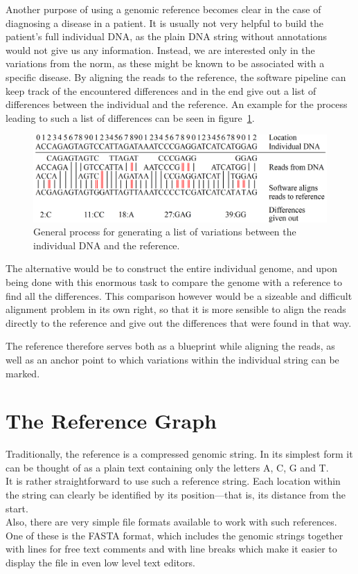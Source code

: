 \documentclass[a4paper,12pt,twoside,BCOR=10mm]{scrbook}
\begin{document}
Another purpose of using a genomic reference becomes clear 
in the case of diagnosing a disease in a patient. 
It is usually not very helpful to build the patient's full individual DNA, as the plain DNA string without 
annotations would not give us any information. 
Instead, we are interested only in the variations from the norm, 
as these might be known to be associated with a specific disease. 
By aligning the reads to the reference, the software pipeline can keep track 
of the encountered differences and in the end give out a list of differences between the individual and the reference. 
An example for the process leading to such a list of differences 
can be seen in figure~\ref{fig:evo_intro_general_variation_calling_process}. 
\begin{figure}[!htb]
\centering
\includegraphics[width=\textwidth]{evo_intro_general_variation_calling_process.png}
\caption[General variation calling process]{General process for generating a list of variations between the individual DNA and the reference.} \label{fig:evo_intro_general_variation_calling_process}
\end{figure}
The alternative would be to construct the entire individual genome, and upon being done with this enormous task to 
compare the genome with a reference to find all the differences. This comparison however would be a sizeable 
and difficult alignment problem in its own right, so that it is more sensible to align the reads directly to the reference 
and give out the differences that were found in that way.

The reference therefore serves both as a blueprint while aligning the reads, 
as well as an anchor point to which variations within the individual string can be marked.

\section{The Reference Graph}

Traditionally, the reference is a compressed genomic string. 
In its simplest form it can be thought of as a plain text containing only the letters 
A, C, G and T. \\
It is rather straightforward to use such a reference string. 
Each location within the string can clearly be identified by its position---that is, 
its distance from the start. \\
Also, there are very simple file formats available to work with 
such references. One of these is the FASTA format, which includes the genomic 
strings together with lines for free text comments and with line breaks which 
make it easier to display the file in even low level text editors.
\end{document}
